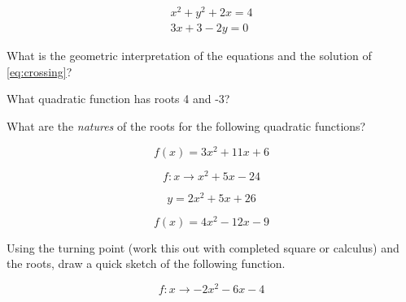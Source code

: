\documentclass{homework}
\begin{document}
\begin{align}\label{eq:crossing}
    x^2 + y^2 + 2x = 4 \\
    3x + 3 -2y = 0 
\end{align}

What is the geometric interpretation of the equations and the solution of \ref{eq:crossing}?

\exercise*
What quadratic function has roots 4 and -3?


\exercise*
What are the \textit{natures} of the roots for the following quadratic functions?

\begin{equation}
   f(x) =  3x^2 + 11x + 6
\end{equation}

\begin{equation}
    f:x \rightarrow x^2 + 5x - 24
\end{equation}

\begin{equation}
     y = 2x^2 + 5x + 26
\end{equation}

\begin{equation} 
   f(x) =  4x^2 - 12x - 9
\end{equation}

\exercise*
Using the turning point (work this out with completed square or calculus) and the roots, draw a quick sketch of the following function.

\begin{equation}
  f: x \rightarrow {-2x^2 - 6x -4}  
\end{equation}
\end{document}
